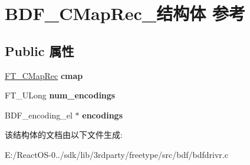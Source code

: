 \hypertarget{struct_b_d_f___c_map_rec__}{}\section{B\+D\+F\+\_\+\+C\+Map\+Rec\+\_\+结构体 参考}
\label{struct_b_d_f___c_map_rec__}
\subsection*{Public 属性}
\begin{DoxyCompactItemize}
\item 
\mbox{\label{struct_b_d_f___c_map_rec___a501e9352975c1d69528def32adad791e}} 
\hyperlink{struct_f_t___c_map_rec__}{F\+T\+\_\+\+C\+Map\+Rec} {\bfseries cmap}
\item 
\mbox{\label{struct_b_d_f___c_map_rec___a00c7bc8055ddee6858c641c08ece874b}} 
F\+T\+\_\+\+U\+Long {\bfseries num\+\_\+encodings}
\item 
\mbox{\label{struct_b_d_f___c_map_rec___ae765d57d6633b6453d98a3116ad37d92}} 
B\+D\+F\+\_\+encoding\+\_\+el $\ast$ {\bfseries encodings}
\end{DoxyCompactItemize}


该结构体的文档由以下文件生成\+:\begin{DoxyCompactItemize}
\item 
E\+:/\+React\+O\+S-\/0../sdk/lib/3rdparty/freetype/src/bdf/bdfdrivr.\+c\end{DoxyCompactItemize}
